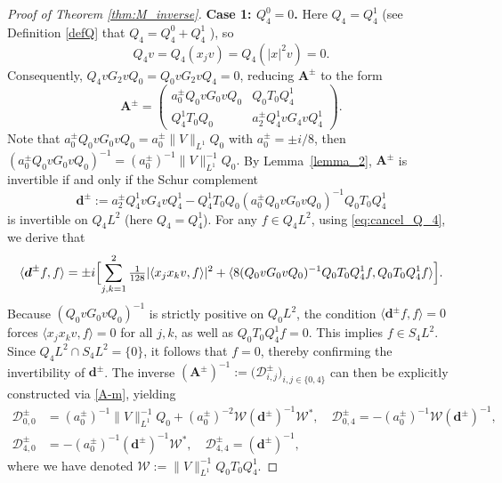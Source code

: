 \documentclass[reqno]{amsart}
\numberwithin{equation}{section}
\begin{document}
\begin{proof}[Proof of Theorem \ref{thm:M_inverse}]
	\textbf{Case 1: $Q_4^0 = 0$.} Here $Q_4 = Q_4^1$ (see Definition \ref{defQ} that  $Q_4 =Q_4^0 +Q_4^1$ ), so
	\begin{equation}\label{eq:cancel_Q_4}
		Q_4 v = Q_4(x_j v) = Q_4(|x|^2 v) = 0.
	\end{equation}
	Consequently, $Q_4 v G_2 v Q_0 = Q_0 v G_2 v Q_4 = 0$, reducing $\mathbf{A}^{\pm}$ to the  form  
	\[
	\mathbf{A}^{\pm} = \begin{pmatrix}
		a_0^\pm Q_0 v G_0 v Q_0 & Q_0 T_0 Q_4^1 \\
		Q_4^1 T_0 Q_0 & a_2^\pm Q_4^1 v G_4 v Q_4^1
	\end{pmatrix}.
	\]
Note that $a_0^\pm Q_0 v G_0 v Q_0= a_0^\pm\|V\|_{L^1}Q_0$ with $a_0^\pm=\pm i/8$, then $(a_0^\pm Q_0 v G_0 v Q_0)^{-1}=(a_0^\pm)^{-1}\|V\|_{L^1}^{-1}Q_0.$
	By Lemma~\ref{lemma_2}, $\mathbf{A}^{\pm}$ is invertible if and only if the Schur complement 
	\[
	\boldsymbol{d}^\pm := a_2^\pm Q_4^1 v G_4 v Q_4^1 - Q_4^1 T_0 Q_0 (a_0^\pm Q_0 v G_0 v Q_0)^{-1} Q_0 T_0 Q_4^1
	\]
	is invertible on $Q_4L^2$ (here $Q_4=Q_4^1$). For any $f \in Q_4 L^2$, using \eqref{eq:cancel_Q_4}, we 
	derive that
	\[
		\langle \boldsymbol{d}^\pm f, f \rangle = \pm i \Bigl[ \sum_{j,k=1}^2 \tfrac{1}{128} |\langle x_j x_k v, f \rangle|^2 + \langle 8 (Q_0 v G_0 v Q_0)^{-1} Q_0 T_0 Q_4^1 f, Q_0 T_0 Q_4^1 f \rangle \Bigr].
	\]
	Because $(Q_0 v G_0 v Q_0)^{-1}$ is strictly positive on $Q_0 L^2$, the condition $\langle \boldsymbol{d}^\pm f, f \rangle = 0$ forces $\langle x_j x_k v, f \rangle = 0$ for all $j,k$, as well as $Q_0 T_0 Q_4^1 f = 0$. This implies $f \in S_4 L^2$. Since $Q_4 L^2 \cap S_4 L^2 = \{0\}$, it follows that $f = 0$, thereby confirming the invertibility of $\boldsymbol{d}^\pm$. The inverse $(\mathbf{A}^{\pm})^{-1} := \bigl(\mathcal{D}_{i,j}^{\pm}\bigr)_{i,j\in\{0,4\}}$ can then be explicitly constructed via \eqref{A-m}, yielding  
\begin{equation}\label{D00}  
	\begin{aligned}  
		\mathcal{D}_{0,0}^{\pm} &= (a_0^\pm)^{-1}\|V\|_{L^1}^{-1}Q_0 + (a_0^\pm)^{-2} \mathcal{W} (\boldsymbol{d}^\pm)^{-1} \mathcal{W}^*,  \quad  
		\mathcal{D}_{0,4}^{\pm} = - (a_0^\pm)^{-1} \mathcal{W} (\boldsymbol{d}^\pm)^{-1},  \\  
		\mathcal{D}_{4,0}^{\pm} &= - (a_0^\pm)^{-1} (\boldsymbol{d}^\pm)^{-1} \mathcal{W}^*,\quad  
		\mathcal{D}_{4,4}^{\pm} = (\boldsymbol{d}^\pm)^{-1},  
	\end{aligned}  
\end{equation}  
where we have denoted $\mathcal{W} := \|V\|_{L^1}^{-1} Q_0 T_0 Q_4^1$.  
	

\end{proof}
\end{document}
